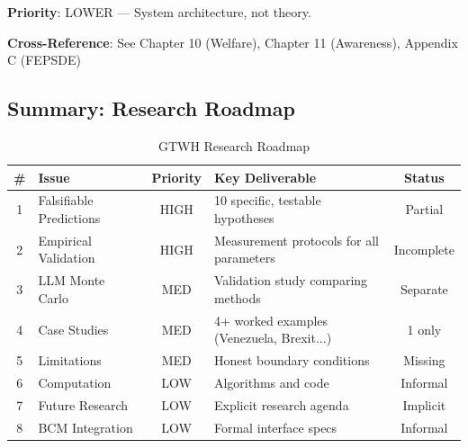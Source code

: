 \begin{tcolorbox}[colback=green!5!white, colframe=green!75!black, title=Status: Informal References Only]
\textbf{Priority}: \colorbox{green!20}{LOWER} --- System architecture, not theory.

\textbf{Cross-Reference}: See Chapter 10 (Welfare), Chapter 11 (Awareness), Appendix C (FEPSDE)
\end{tcolorbox}

\subsection{Summary: Research Roadmap}

\begin{table}[htbp]
\centering
\caption{GTWH Research Roadmap}
\label{tab:aaa-roadmap}
\renewcommand{\arraystretch}{1.3}
\small
\begin{tabular}{@{}clcp{5cm}c@{}}
\toprule
\textbf{\#} & \textbf{Issue} & \textbf{Priority} & \textbf{Key Deliverable} & \textbf{Status} \\
\midrule
1 & Falsifiable Predictions & \colorbox{red!20}{HIGH} & 10 specific, testable hypotheses & Partial \\
2 & Empirical Validation & \colorbox{red!20}{HIGH} & Measurement protocols for all parameters & Incomplete \\
3 & LLM Monte Carlo & \colorbox{yellow!20}{MED} & Validation study comparing methods & Separate \\
4 & Case Studies & \colorbox{yellow!20}{MED} & 4+ worked examples (Venezuela, Brexit...) & 1 only \\
5 & Limitations & \colorbox{yellow!20}{MED} & Honest boundary conditions & Missing \\
6 & Computation & \colorbox{green!20}{LOW} & Algorithms and code & Informal \\
7 & Future Research & \colorbox{green!20}{LOW} & Explicit research agenda & Implicit \\
8 & BCM Integration & \colorbox{green!20}{LOW} & Formal interface specs & Informal \\
\bottomrule
\end{tabular}
\end{table}

